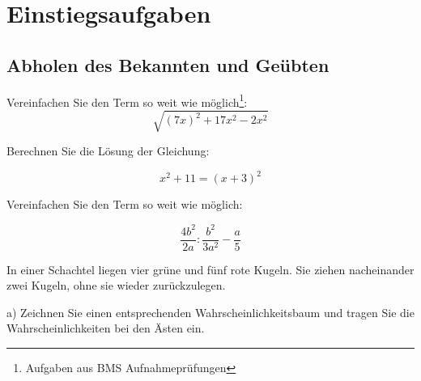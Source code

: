
\section*{Einstiegsaufgaben}

\subsection*{Abholen des Bekannten und Geübten}



Vereinfachen Sie den Term so weit wie möglich\footnote{Aufgaben aus
    BMS Aufnahmeprüfungen}:
  $$\sqrt{(7x)^2 + 17x^2 - 2x^2}$$



Berechnen Sie die Lösung der Gleichung:

  $$x^2 + 11 = (x+3)^2$$



  Vereinfachen Sie den Term so weit wie möglich:

  $$\frac{4b^2}{2a}:\frac{b^2}{3a^2} - \frac{a}{5}$$



In einer Schachtel liegen vier grüne und fünf rote Kugeln.
Sie ziehen nacheinander zwei Kugeln, ohne sie wieder zurückzulegen.

a) Zeichnen Sie einen entsprechenden Wahrscheinlichkeitsbaum und tragen Sie die
Wahrscheinlichkeiten bei den Ästen ein.



